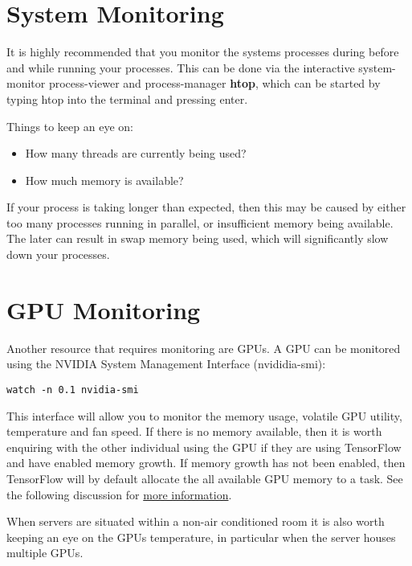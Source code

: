 \documentclass[
]{book}
\providecommand{\tightlist}{%
  \setlength{\itemsep}{0pt}\setlength{\parskip}{0pt}}
\begin{document}
\hypertarget{system-monitoring}{%
\section{System Monitoring}\label{system-monitoring}}

It is highly recommended that you monitor the systems processes during before and while running your processes. This can be done via the interactive system-monitor process-viewer and process-manager \textbf{htop}, which can be started by typing htop into the terminal and pressing enter.

Things to keep an eye on:

\begin{itemize}
\tightlist
\item
  How many threads are currently being used?
\item
  How much memory is available?
\end{itemize}

If your process is taking longer than expected, then this may be caused by either too many processes running in parallel, or insufficient memory being available. The later can result in swap memory being used, which will significantly slow down your processes.

\hypertarget{gpu-monitoring}{%
\section{GPU Monitoring}\label{gpu-monitoring}}

Another resource that requires monitoring are GPUs. A GPU can be monitored using the NVIDIA System Management Interface (nvididia-smi):

\begin{verbatim}
watch -n 0.1 nvidia-smi
\end{verbatim}

This interface will allow you to monitor the memory usage, volatile GPU utility, temperature and fan speed. If there is no memory available, then it is worth enquiring with the other individual using the GPU if they are using TensorFlow and have enabled memory growth. If memory growth has not been enabled, then TensorFlow will by default allocate the all available GPU memory to a task. See the following discussion for \href{https://stackoverflow.com/questions/34199233/how-to-prevent-tensorflow-from-allocating-the-totality-of-a-gpu-memory}{more information}.

When servers are situated within a non-air conditioned room it is also worth keeping an eye on the GPUs temperature, in particular when the server houses multiple GPUs.

  
\end{document}
